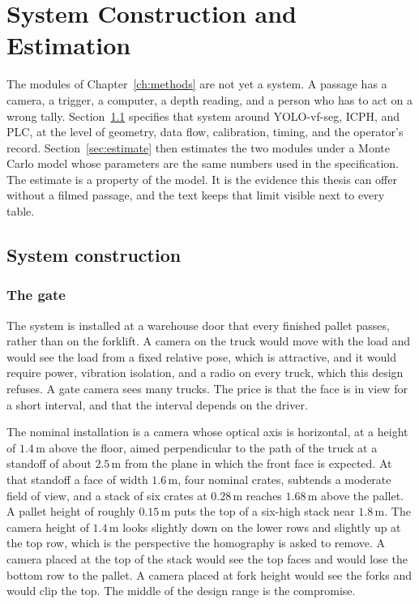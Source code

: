 \chapter{System Construction and Estimation}
\label{ch:system}

The modules of Chapter~\ref{ch:methods} are not yet a system. A passage has a camera, a trigger, a computer, a depth reading, and a person who has to act on a wrong tally. Section~\ref{sec:build} specifies that system around YOLO-vf-seg, ICPH, and PLC, at the level of geometry, data flow, calibration, timing, and the operator's record. Section~\ref{sec:estimate} then estimates the two modules under a Monte Carlo model whose parameters are the same numbers used in the specification. The estimate is a property of the model. It is the evidence this thesis can offer without a filmed passage, and the text keeps that limit visible next to every table.

\section{System construction}
\label{sec:build}

\subsection{The gate}
\label{sec:gate}

The system is installed at a warehouse door that every finished pallet passes, rather than on the forklift. A camera on the truck would move with the load and would see the load from a fixed relative pose, which is attractive, and it would require power, vibration isolation, and a radio on every truck, which this design refuses. A gate camera sees many trucks. The price is that the face is in view for a short interval, and that the interval depends on the driver.

The nominal installation is a camera whose optical axis is horizontal, at a height of $1.4\,\mathrm{m}$ above the floor, aimed perpendicular to the path of the truck at a standoff of about $2.5\,\mathrm{m}$ from the plane in which the front face is expected. At that standoff a face of width $1.6\,\mathrm{m}$, four nominal crates, subtends a moderate field of view, and a stack of six crates at $0.28\,\mathrm{m}$ reaches $1.68\,\mathrm{m}$ above the pallet. A pallet height of roughly $0.15\,\mathrm{m}$ puts the top of a six-high stack near $1.8\,\mathrm{m}$. The camera height of $1.4\,\mathrm{m}$ looks slightly down on the lower rows and slightly up at the top row, which is the perspective the homography is asked to remove. A camera placed at the top of the stack would see the top faces and would lose the bottom row to the pallet. A camera placed at fork height would see the forks and would clip the top. The middle of the design range is the compromise.

